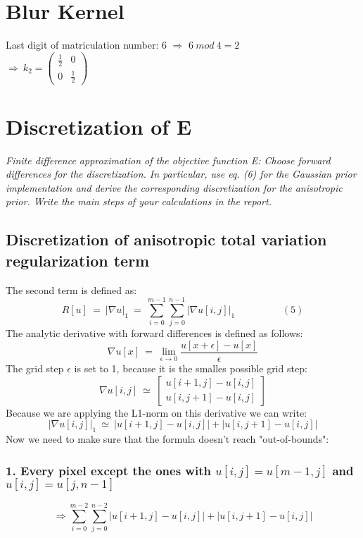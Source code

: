 \documentclass{report}
\begin{document}
	\section*{Blur Kernel}
	\startsection
		Last digit of matriculation number: 6 $\Rightarrow$ $6 \ mod \ 4 = 2$ \\
		$\Rightarrow \ k_2 = \begin{pmatrix} \frac{1}{2} & 0 \\ 0 & \frac{1}{2} \end{pmatrix}$
	\closesection

	\section{Discretization of E}
	\startsection
		\textit{Finite difference approximation of the objective function E: Choose forward differences for the discretization.
In particular, use eq. (6) for the Gaussian prior implementation and derive the corresponding discretization
for the anisotropic prior. Write the main steps of your calculations in the report.}
		\subsection{Discretization of anisotropic total variation regularization term}
		\startsubsection
			The second term is defined as:
			\[ R[u] \ = \ | \nabla u | _1 \ = \ \sum_{i=0}^{m-1} \sum_{j=0}^{n-1} | \nabla u[i,j] | _1 \hspace{2cm} (5)\]
			The analytic derivative with forward differences is defined as follows:
			\[ \nabla u[x] \ = \ \lim_{\epsilon \rightarrow 0} \frac{u[x + \epsilon] - u[x]}{\epsilon} \]
			The grid step $\epsilon$ is set to 1, because it is the smalles possible grid step:
			\[ \nabla u[i,j] \ \simeq \ \begin{bmatrix} u[i+1,j] - u[i,j] \\ u[i,j+1] - u[i,j] \end{bmatrix} \]
			Because we are applying the L1-norm on this derivative we can write:
			\[ | \nabla u[i,j] | _1 \ \simeq \ | u[i+1,j] - u[i,j] | + | u[i,j+1] - u[i,j] | \]
			Now we need to make sure that the formula doesn't reach "out-of-bounds":
			\subsubsection{1. Every pixel except the ones with $u[i,j] = u[m-1,j]$ and $u[i,j] = u[j,n-1]$}
			\[
				\Rightarrow \sum_{i=0}^{m-2} \sum_{j=0}^{n-2} | u[i+1,j] - u[i,j] | + | u[i,j+1] - u[i,j] |
			\]
\end{document}
